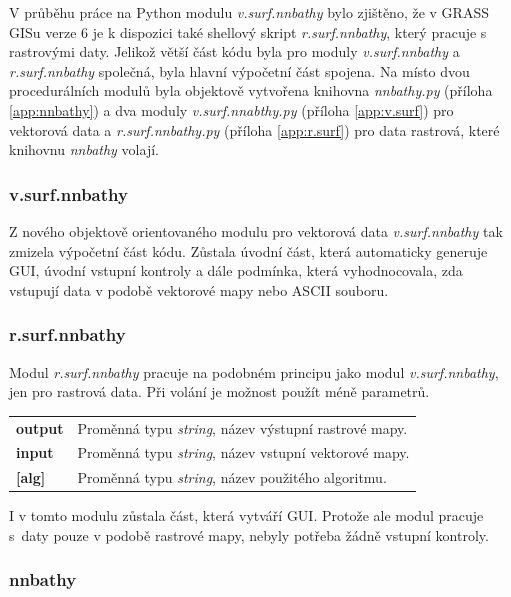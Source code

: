 \documentclass[12pt,a4paper]{article}
\begin{document}
V průběhu práce na Python modulu \emph{v.surf.nnbathy} bylo
zjištěno, že v GRASS GISu verze 6 je k dispozici také shellový skript
\emph{r.surf.nnbathy}, který pracuje s rastrovými daty. Jelikož větší
část kódu byla pro moduly \emph{v.surf.nnbathy} a \emph{r.surf.nnbathy} společná,
byla hlavní výpočetní část spojena. Na místo dvou procedurálních
modulů byla objektově vytvořena knihovna \emph{nnbathy.py} (příloha \ref{app:nnbathy}) a dva
moduly \emph{v.surf.nnabthy.py} (příloha \ref{app:v.surf}) pro vektorová data a
\emph{r.surf.nnbathy.py} (příloha \ref{app:r.surf}) pro data rastrová, které knihovnu
\emph{nnbathy} volají.

\subsubsection{v.surf.nnbathy}
Z nového objektově orientovaného modulu pro vektorová data \emph{v.surf.nnbathy} tak zmizela výpočetní část kódu. Zůstala úvodní část, která automaticky generuje GUI,
úvodní vstupní kontroly a dále podmínka, která vyhodnocovala, zda vstupují data v podobě
vektorové mapy nebo ASCII souboru.

\subsubsection{r.surf.nnbathy}
\label{subsub:r.surf.nnbathy}

Modul \emph{r.surf.nnbathy} pracuje na podobném principu jako modul
\emph{v.surf.nnbathy}, jen pro rastrová data. Při volání je možnost
použít méně parametrů.

\begin{tabular}{ll}
\textbf{output}& Proměnná typu \emph{string}, název výstupní rastrové mapy.\\
\textbf{input}& Proměnná typu \emph{string}, název vstupní vektorové mapy.\\
\textbf{[alg]}& Proměnná typu \emph{string}, název použitého algoritmu.\\
\end{tabular}

I v tomto modulu zůstala část, která vytváří GUI. Protože ale modul
pracuje s~daty pouze v podobě rastrové mapy, nebyly potřeba žádně
vstupní kontroly.

\subsubsection{nnbathy}
\end{document}
